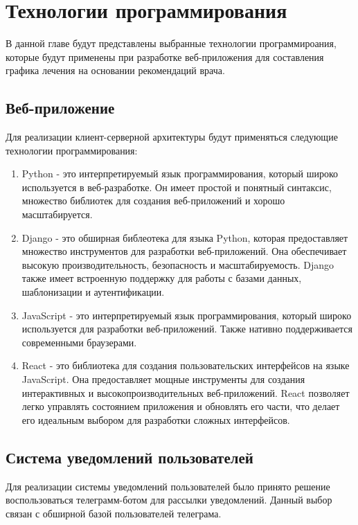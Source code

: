 \chapter{Технологии программирования}
    В данной главе будут представлены выбранные технологии программироания, %
    которые будут применены при разработке веб-приложения для составления %
    графика лечения на основании рекомендаций врача.

    \section{Веб-приложение}
        Для реализации клиент-серверной архитектуры будут применяться %
        следующие технологии программирования:
        \begin{enumerate}
            \item Python - \cite{python} это интерпретируемый язык программирования, который %
            широко используется в веб-разработке. Он имеет простой и понятный синтаксис, %
            множество библиотек для создания веб-приложений и хорошо масштабируется. %
            \item Django \cite{django} - это обширная библеотека для %
            языка Python, которая предоставляет множество инструментов для %
            разработки веб-приложений. Она обеспечивает высокую производительность, %
            безопасность и масштабируемость. Django также имеет встроенную поддержку %
            для работы с базами данных, шаблонизации и аутентификации.
            \item JavaScript \cite{javascript} - это интерпретируемый язык программирования, %
            который широко используется %
            для разработки веб-приложений. Также нативно поддерживается современными браузерами.
            \item React \cite{react} - это библиотека для создания пользовательских %
            интерфейсов на языке JavaScript. Она предоставляет мощные инструменты %
            для создания интерактивных и высокопроизводительных веб-приложений. %
            React позволяет легко управлять состоянием приложения и обновлять %
            его части, что делает его идеальным выбором для разработки %
            сложных интерфейсов.
        \end{enumerate}
    
    \section{Система уведомлений пользователей}
        Для реализации системы уведомлений пользователей было принято решение %
        воспользоваться телеграмм-ботом для рассылки уведомлений. Данный выбор связан %
        с обширной базой пользователей телеграма\cite{telegram}.

